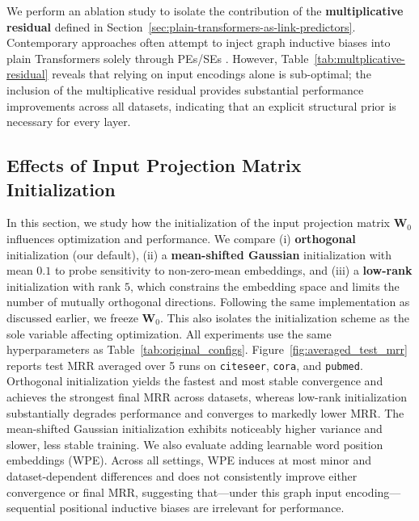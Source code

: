 \documentclass{article}
\theoremstyle{plain}
\theoremstyle{definition}
\theoremstyle{remark}
\begin{document}
We perform an ablation study to isolate the contribution of the \textbf{multiplicative residual} defined in Section~\ref{sec:plain-transformers-as-link-predictors}. Contemporary approaches often attempt to inject graph inductive biases into plain Transformers solely through PEs/SEs \cite{dwivedi2021generalization, sanford_understanding_2024, yehudai_depth-width_2025, ma_plain_2025}. However, Table~\ref{tab:multplicative-residual} reveals that relying on input encodings alone is sub-optimal; the inclusion of the multiplicative residual provides substantial performance improvements across all datasets, indicating that an explicit structural prior is necessary for every layer.

\subsection{Effects of Input Projection Matrix Initialization} \label{app:effects-of-input-projection-matrix-initialization}

In this section, we study how the initialization of the input projection matrix $\mathbf{W}_0$ influences optimization and performance. We compare (i) \textbf{orthogonal} initialization (our default), (ii) a \textbf{mean-shifted Gaussian} initialization with mean $0.1$ to probe sensitivity to non-zero-mean embeddings, and (iii) a \textbf{low-rank} initialization with rank $5$, which constrains the embedding space and limits the number of mutually orthogonal directions. Following the same implementation as discussed earlier, we freeze $\mathbf{W}_0$. This also isolates the initialization scheme as the sole variable affecting optimization. All experiments use the same hyperparameters as Table~\ref{tab:original_configs}. Figure~\ref{fig:averaged_test_mrr} reports test MRR averaged over 5 runs on \texttt{citeseer}, \texttt{cora}, and \texttt{pubmed}. Orthogonal initialization yields the fastest and most stable convergence and achieves the strongest final MRR across datasets, whereas low-rank initialization substantially degrades performance and converges to markedly lower MRR. The mean-shifted Gaussian initialization exhibits noticeably higher variance and slower, less stable training. We also evaluate adding learnable word position embeddings (WPE). Across all settings, WPE induces at most minor and dataset-dependent differences and does not consistently improve either convergence or final MRR, suggesting that---under this graph input encoding---sequential positional inductive biases are irrelevant for performance.
\end{document}
